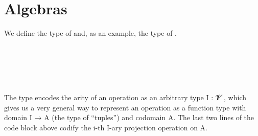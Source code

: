 \documentclass[a4paper,UKenglish,cleveref,autoref,thm-restate]{lipics-v2021}
\begin{document}
\section{Algebras}\label{sec:types-for-algebras}

\newcommand\signatOV{\AgdaFunction{Signature}\AgdaSpace{}\AgdaBound{𝓞}\AgdaSpace{}\AgdaBound{𝓥}\xspace}
We define the type of  and, as an example, the type of .
\ccpad
\begin{code}%
\>[0]\AgdaSpace{}%
\AgdaSymbol{:}\AgdaSpace{}%
\AgdaSpace{}%
\AgdaSpace{}%
\AgdaSpace{}%
\AgdaSpace{}%
\AgdaSpace{}%
\AgdaSpace{}%
\AgdaSpace{}%
\AgdaSpace{}%
\AgdaSpace{}%
\<%
\\
%
\>[0]\AgdaSpace{}%
\AgdaSpace{}%
\AgdaSpace{}%
\AgdaSymbol{=}\AgdaSpace{}%
\AgdaSymbol{(}\AgdaSpace{}%
\AgdaSpace{}%
\AgdaSymbol{)}\AgdaSpace{}%
\AgdaSpace{}%
\<%
\\
\\
\>[1]\AgdaSpace{}%
\AgdaSymbol{:}\AgdaSpace{}%
\AgdaSymbol{\{}\AgdaSpace{}%
\AgdaSymbol{:}\AgdaSpace{}%
\AgdaSpace{}%
\AgdaSpace{}%
\AgdaSymbol{\}}\AgdaSpace{}%
\AgdaSymbol{\{}\AgdaSpace{}%
\AgdaSymbol{:}\AgdaSpace{}%
\AgdaSpace{}%
\AgdaSpace{}%
\AgdaSymbol{\}}\AgdaSpace{}%
\AgdaSpace{}%
\AgdaSpace{}%
\AgdaSpace{}%
\AgdaSpace{}%
\AgdaSpace{}%
\<%
\\
%
\>[1]\AgdaSpace{}%
\AgdaSpace{}%
\AgdaSpace{}%
\AgdaSymbol{=}\AgdaSpace{}%
\AgdaSpace{}%
\<%
\end{code}
\ccpad
The type  encodes the arity of an operation as an arbitrary type \ab I : \ab 𝓥 ̇, which gives us a very general way to represent an operation as a function type with domain \ab I → \ab A (the type of ``tuples'') and codomain \ab A. The last two lines of the code block above codify the \ab i-th \ab I-ary projection operation on \ab A.
\end{document}
